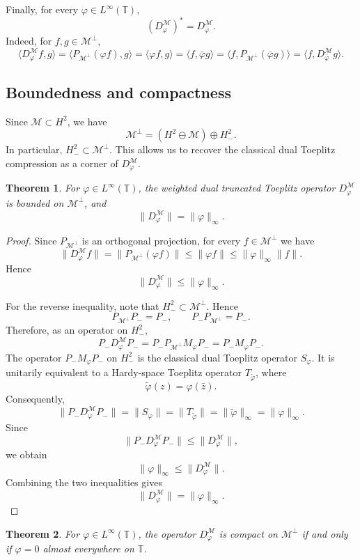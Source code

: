 \documentclass[12pt]{amsart}
\newtheorem{theorem}{Theorem}[section]
\theoremstyle{definition}
\theoremstyle{remark}
\def \T{\mathbb{T}}
\newcommand{\clm}{\mathcal{M}}
\newcommand{\vp}{\varphi}
\numberwithin{equation}{section}
\begin{document}
Finally, for every $\vp\in L^\infty(\T)$,
\[
(D_\vp^{\clm})^*=D_{\bar\vp}^{\clm}.
\]
Indeed, for $f,g\in\clm^\perp$,
\[
\langle D_\vp^{\clm}f,g\rangle
=
\langle P_{\clm^\perp}(\vp f),g\rangle
=
\langle \vp f,g\rangle
=
\langle f,\bar\vp g\rangle
=
\langle f,P_{\clm^\perp}(\bar\vp g)\rangle
=
\langle f,D_{\bar\vp}^{\clm}g\rangle .
\]

\subsection{Boundedness and compactness}

Since $\clm\subset H^2$, we have
\[
\clm^\perp=(H^2\ominus \clm)\oplus H^2_{-}.
\]
In particular, $H_{-}^2\subset \clm^\perp$. This allows us to recover the classical dual Toeplitz compression as a corner of $D_\vp^\clm$.

\begin{theorem}\label{thm:boundedness}
For $\vp\in L^\infty(\T)$, the weighted dual truncated Toeplitz operator $D_\vp^\clm$ is bounded on $\clm^\perp$, and
\[
\|D_\vp^\clm\|=\|\vp\|_\infty .
\]
\end{theorem}

\begin{proof}
Since $P_{\clm^\perp}$ is an orthogonal projection, for every
$f\in\clm^\perp$ we have
\[
\|D_\vp^\clm f\|
=
\|P_{\clm^\perp}(\vp f)\|
\leq
\|\vp f\|
\leq
\|\vp\|_\infty\|f\|.
\]
Hence
\[
\|D_\vp^\clm\|\leq \|\vp\|_\infty.
\]

For the reverse inequality, note that $H_{-}^2\subset\clm^\perp$. Hence
\[
P_{\clm^\perp}P_{-}=P_{-},
\qquad
P_{-}P_{\clm^\perp}=P_{-}.
\]
Therefore, as an operator on $H_{-}^2$,
\[
P_{-}D_\vp^\clm P_{-}
=
P_{-}P_{\clm^\perp}M_\vp P_{-}
=
P_{-}M_\vp P_{-}.
\]
The operator $P_{-}M_\vp P_{-}$ on $H_{-}^2$ is the classical dual Toeplitz operator $S_\vp$. It is unitarily equivalent to a Hardy-space Toeplitz operator $T_{\widetilde{\vp}}$, where
\[
\widetilde{\vp}(z)=\vp(\bar{z}).
\]
Consequently,
\[
\|P_{-}D_\vp^\clm P_{-}\|
=
\|S_\vp\|
=
\|T_{\widetilde{\vp}}\|
=
\|\widetilde{\vp}\|_\infty
=
\|\vp\|_\infty.
\]
Since
\[
\|P_{-}D_\vp^\clm P_{-}\|\leq \|D_\vp^\clm\|,
\]
we obtain
\[
\|\vp\|_\infty\leq \|D_\vp^\clm\|.
\]
Combining the two inequalities gives
\[
\|D_\vp^\clm\|=\|\vp\|_\infty.
\]
\end{proof}

\begin{theorem}\label{thm:compactness}
For $\vp\in L^\infty(\T)$, the operator $D_\vp^\clm$ is compact on
$\clm^\perp$ if and only if $\vp=0$ almost everywhere on $\T$.
\end{theorem}
\end{document}
